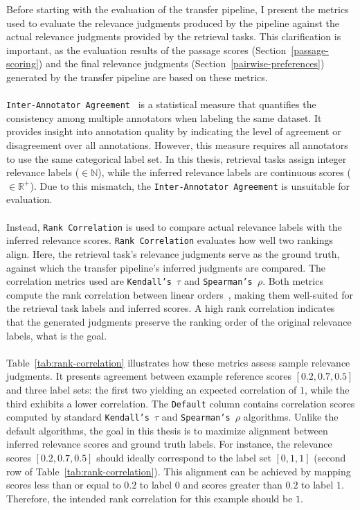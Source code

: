 Before starting with the evaluation of the transfer pipeline, I present the metrics used to evaluate the relevance judgments produced by the pipeline against the actual relevance judgments provided by the retrieval tasks. This clarification is important, as the evaluation results of the passage scores \mbox{(Section~\ref{passage-scoring})} and the final relevance judgments (Section~\ref{pairwise-preferences}) generated by the transfer pipeline are based on these metrics.
\\\\
\texttt{Inter-Annotator Agreement}~\citep{artstein:2017} is a statistical measure that quantifies the consistency among multiple annotators when labeling the same dataset. It provides insight into annotation quality by indicating the level of agreement or disagreement over all annotations. However, this measure requires all annotators to use the same categorical label set. In this thesis, retrieval tasks assign integer relevance labels ($\in \mathbb{N}$), while the inferred relevance labels are continuous scores ($\in \mathbb{R}^{+}$). Due to this mismatch, the \mbox{\texttt{Inter-Annotator Agreement}} is unsuitable for evaluation.
\\\\
Instead, \texttt{Rank Correlation} is used to compare actual relevance labels with the inferred relevance scores. \texttt{Rank Correlation} evaluates how well two rankings align. Here, the retrieval task's relevance judgments serve as the ground truth, against which the transfer pipeline's inferred judgments are compared. The correlation metrics used are \texttt{Kendall's $\tau$} and \texttt{Spearman's $\rho$}. Both metrics compute the rank correlation between linear orders~\citep{monjardet:1998}, making them well-suited for the retrieval task labels and inferred scores. A high rank correlation indicates that the generated judgments preserve the ranking order of the original relevance labels, what is the goal.
\\\\
Table~\ref{tab:rank-correlation} illustrates how these metrics assess sample relevance judgments. It presents agreement between example reference scores $[0.2, 0.7, 0.5]$ and three label sets: the first two yielding an expected correlation of $1$, while the third exhibits a lower correlation. The \texttt{Default} column contains correlation scores computed by standard \texttt{Kendall's $\tau$} and \texttt{Spearman's $\rho$} algorithms. Unlike the default algorithms, the goal in this thesis is to maximize alignment between inferred relevance scores and ground truth labels. For instance, the relevance scores $[0.2, 0.7, 0.5]$ should ideally correspond to the label set $[0, 1, 1]$ (second row of Table~\ref{tab:rank-correlation}). This alignment can be achieved by mapping scores less than or equal to $0.2$ to label $0$ and scores greater than $0.2$ to label $1$. Therefore, the intended rank correlation for this example should be $1$.
